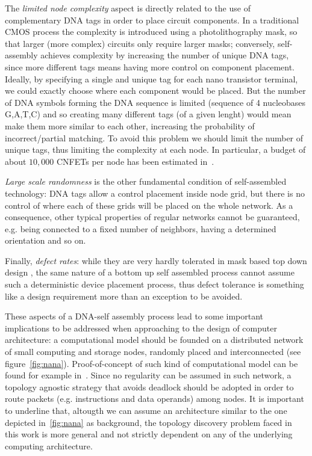 The \emph{limited node complexity} aspect is directly
related to the use of complementary DNA tags in order to place circuit
components. In a traditional CMOS process the complexity is introduced
using a photolithography mask, so that larger (more complex) circuits
only require larger masks; conversely, self-assembly achieves
complexity by increasing the number of unique DNA tags, since more
different tags means having more control on component placement. Ideally, by specifying a single
and unique tag for each nano transistor terminal, we could exactly
choose where each component would be placed. But the number of DNA
symbols forming the DNA sequence is limited (sequence of 4 nucleobases
G,A,T,C) and so creating many different tags (of a given lenght) would
mean make them more similar to each other, increasing the probability
of incorrect/partial matching. To avoid this problem we should limit
the number of unique tags, thus limiting the complexity at each node.
In particular, a budget of about $10,000$ CNFETs per node has been
estimated in~\cite{liu_jetcs}.

\emph{Large scale randomness} is the other fundamental condition of
self-assembled technology: DNA tags allow a control placement inside
node grid, but there is no control of where each of these  grids will
be placed on the whole network. As a consequence, other typical
properties of regular networks cannot be guaranteed, e.g. being
connected to a fixed number of neighbors, having a determined
orientation and so on.

Finally, \emph{defect rates}: while they are very hardly tolerated in mask
based top down design , the same nature of a bottom up self
assembled process cannot assume such a deterministic device placement
process, thus defect tolerance is something like a design requirement
more than an exception to be avoided.

These aspects of a DNA-self assembly process lead to some important
implications to be addressed when approaching to the design of
computer architecture: a computational model should be founded on a
distributed network of small computing and storage nodes, randomly
placed and interconnected (see figure~\ref{fig:nana}).
Proof-of-concept of such kind of computational model can be found for
example in~\cite{patwardhan2006_1}.  Since no regularity can be
assumed in such network, a topology agnostic strategy that avoids
deadlock should be adopted in order to route packets (e.g.
instructions and data operands) among nodes.  It is important to
underline that, altougth we can assume an architecture similar to the
one depicted in~\ref{fig:nana} as background, the topology discovery
problem faced in this work is more general and not strictly dependent on any of the
underlying computing architecture.


